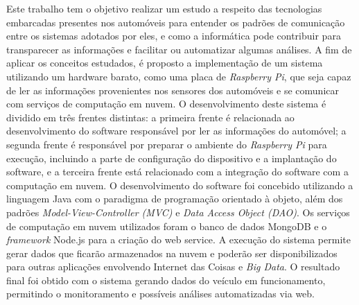 
\setlength{\absparsep}{18pt} 
\begin{resumo}

\noindent 
Este trabalho tem o objetivo realizar um estudo a respeito das tecnologias embarcadas presentes nos automóveis para entender os padrões de comunicação entre os sistemas adotados por eles, e como a informática pode contribuir para transparecer as informações e facilitar ou automatizar algumas análises. A fim de aplicar os conceitos estudados, é proposto a implementação de um sistema utilizando um hardware barato, como uma placa de \textit{Raspberry Pi}, que seja capaz de ler as informações provenientes nos sensores dos automóveis e se comunicar com serviços de computação em nuvem. O desenvolvimento deste sistema é dividido em três frentes distintas: a primeira frente é relacionada ao desenvolvimento do software responsável por ler as informações do automóvel; a segunda frente é responsável por preparar o ambiente do \textit{Raspberry Pi} para execução, incluindo a parte de configuração do dispositivo e a implantação do software, e a terceira frente está relacionado com a integração do software com a computação em nuvem. O desenvolvimento do software foi concebido utilizando a linguagem Java com o paradigma de programação orientado à objeto, além dos padrões\textit{ Model-View-Controller (MVC)} e \textit{Data Access Object (DAO)}. Os serviços de computação em nuvem utilizados foram o banco de dados MongoDB e o \textit{framework} Node.js para a criação do web service. A execução do sistema permite gerar dados que ficarão armazenados na nuvem e poderão ser disponibilizados para outras aplicações envolvendo Internet das Coisas e \textit{Big Data}. O resultado final foi obtido com o sistema gerando dados do veículo em funcionamento, permitindo o monitoramento e possíveis análises automatizadas via web.

\vspace{1cm}


\end{resumo}